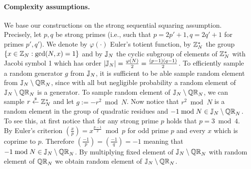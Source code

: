 \paragraph{Complexity assumptions.}
We base our constructions on the strong sequential squaring assumption. Precisely, let $p, q$ be strong primes (i.e., such that $p = 2p'+1,  q= 2q'+1$ for primes $p', q'$). We denote by $\varphi(\cdot)$ Euler's totient function, by $\mathbb{Z}_N^*$ the group $\{x \in \mathbb{Z}_N: \gcd(N,x) = 1\}$ and by $\mathbb{J}_N$ the cyclic subgroup of elements of $\mathbb{Z}_N^*$ with Jacobi symbol 1 which has order $|\mathbb{J}_N| = \frac{\varphi(N)}{2} = \frac{(p-1)(q-1)}{2}$. To efficiently sample a random generator $g$ from $\mathbb{J}_N$, it is sufficient to be able sample random element from $\mathbb{J}_N \setminus \mathbb{QR}_N$, since with all but negligible probability a random element of $\mathbb{J}_N \setminus \mathbb{QR}_N$ is a generator. To sample random element of $\mathbb{J}_N \setminus \mathbb{QR}_N$, we can sample $r \stackrel{{\scriptscriptstyle\$}}{\leftarrow} \mathbb{Z}_N^*$ and let $g:= -r^2 \bmod N$. Now notice that $r^2 \bmod N$ is a random element in the group of quadratic residues and $-1 \bmod N \in \mathbb{J}_N \setminus \mathbb{QR}_N$. To see this, at first notice that for any strong prime $p$ holds that $p = 3 \bmod 4$. By Euler's criterion $\left( \frac{x}{p} \right)= x^{\frac{p-1}{2}} \bmod p$ for odd prime $p$ and every $x$ which is coprime to $p$.  Therefore $\left( \frac{-1}{p} \right)= \left( \frac{-1}{q} \right) = -1$ meaning that $-1 \bmod N \in \mathbb{J}_N \setminus \mathbb{QR}_N$. By multiplying fixed element of $\mathbb{J}_N \setminus \mathbb{QR}_N$ with random element of $\mathbb{QR}_N$ we obtain random element of $\mathbb{J}_N \setminus \mathbb{QR}_N$.





